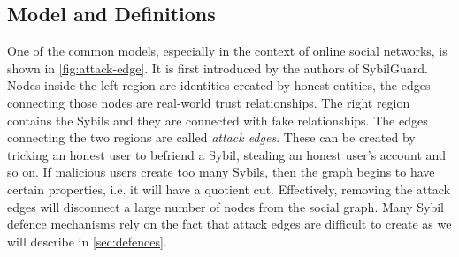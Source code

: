 
\subsection{Model and Definitions}
One of the common models, especially in the context of online social networks,
is shown in \autoref{fig:attack-edge}. It is first introduced by the authors of
SybilGuard\cite{yu2006sybilguard}. Nodes inside the left region are identities
created by honest entities, the edges connecting those nodes are real-world
trust relationships. The right region contains the Sybils and they are connected
with fake relationships. The edges connecting the two regions are called
\emph{attack edges}. These can be created by tricking an honest user to befriend
a Sybil, stealing an honest user's account and so on. If malicious users create
too many Sybils, then the graph begins to have certain properties, i.e. it will
have a quotient cut. Effectively, removing the attack edges will disconnect a
large number of nodes from the social graph. Many Sybil defence mechanisms rely
on the fact that attack edges are difficult to create as we will describe in
\autoref{sec:defences}. 

